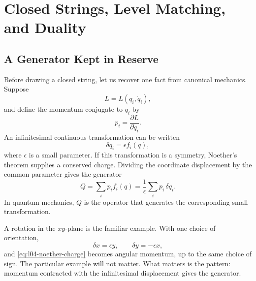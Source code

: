 \chapter{Closed Strings, Level Matching, and Duality}


\section{A Generator Kept in Reserve}

Before drawing a closed string, let us recover one fact from canonical
mechanics. Suppose
\begin{equation}
  L=L(q_i,\dot q_i),
\end{equation}
and define the momentum conjugate to \(q_i\) by
\begin{equation}
  p_i=\frac{\partial L}{\partial\dot q_i}.
\end{equation}
An infinitesimal continuous transformation can be written
\begin{equation}
  \delta q_i=\epsilon f_i(q),
  \label{eq:l04-infinitesimal-transformation}
\end{equation}
where \(\epsilon\) is a small parameter. If this transformation is a
symmetry, Noether's theorem supplies a conserved charge. Dividing the
coordinate displacement by the common parameter gives the generator
\begin{equation}
  Q=\sum_i p_i f_i(q)
   =\frac{1}{\epsilon}\sum_i p_i\,\delta q_i.
  \label{eq:l04-noether-charge}
\end{equation}
In quantum mechanics, \(Q\) is the operator that generates the corresponding
small transformation.

A rotation in the \(xy\)-plane is the familiar example. With one choice of
orientation,
\begin{equation}
  \delta x=\epsilon y,
  \qquad
  \delta y=-\epsilon x,
\end{equation}
and \eqref{eq:l04-noether-charge} becomes angular momentum, up to the same
choice of sign. The particular example will not matter. What matters is the
pattern: momentum contracted with the infinitesimal displacement gives the
generator.

